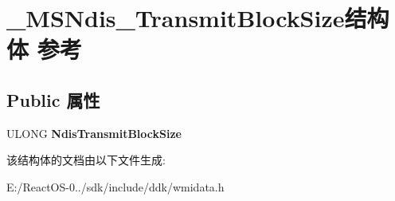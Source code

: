 \hypertarget{struct___m_s_ndis___transmit_block_size}{}\section{\+\_\+\+M\+S\+Ndis\+\_\+\+Transmit\+Block\+Size结构体 参考}
\label{struct___m_s_ndis___transmit_block_size}
\subsection*{Public 属性}
\begin{DoxyCompactItemize}
\item 
\mbox{\label{struct___m_s_ndis___transmit_block_size_ac7f13f424f8dddfa34deb12f10ae1817}} 
U\+L\+O\+NG {\bfseries Ndis\+Transmit\+Block\+Size}
\end{DoxyCompactItemize}


该结构体的文档由以下文件生成\+:\begin{DoxyCompactItemize}
\item 
E\+:/\+React\+O\+S-\/0../sdk/include/ddk/wmidata.\+h\end{DoxyCompactItemize}
